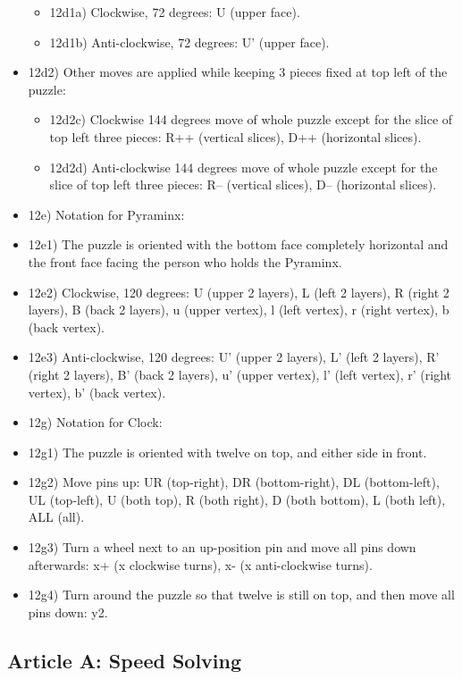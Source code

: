 \begin{itemize}
  \begin{itemize}
  \item
    12d1a) Clockwise, 72 degrees: U (upper face).
  \item
    12d1b) Anti-clockwise, 72 degrees: U' (upper face).
  \end{itemize}
\item
  12d2) Other moves are applied while keeping 3 pieces fixed at top left
  of the puzzle:

  \begin{itemize}
  \item
    12d2c) Clockwise 144 degrees move of whole puzzle except for the
    slice of top left three pieces: R++ (vertical slices), D++
    (horizontal slices).
  \item
    12d2d) Anti-clockwise 144 degrees move of whole puzzle except for
    the slice of top left three pieces: R-- (vertical slices), D--
    (horizontal slices).
  \end{itemize}
\item
  12e) Notation for Pyraminx:
\item
  12e1) The puzzle is oriented with the bottom face completely
  horizontal and the front face facing the person who holds the
  Pyraminx.
\item
  12e2) Clockwise, 120 degrees: U (upper 2 layers), L (left 2 layers), R
  (right 2 layers), B (back 2 layers), u (upper vertex), l (left
  vertex), r (right vertex), b (back vertex).
\item
  12e3) Anti-clockwise, 120 degrees: U' (upper 2 layers), L' (left 2
  layers), R' (right 2 layers), B' (back 2 layers), u' (upper vertex),
  l' (left vertex), r' (right vertex), b' (back vertex).
\item
  12g) Notation for Clock:
\item
  12g1) The puzzle is oriented with twelve on top, and either side in
  front.
\item
  12g2) Move pins up: UR (top-right), DR (bottom-right), DL
  (bottom-left), UL (top-left), U (both top), R (both right), D (both
  bottom), L (both left), ALL (all).
\item
  12g3) Turn a wheel next to an up-position pin and move all pins down
  afterwards: x+ (x clockwise turns), x- (x anti-clockwise turns).
\item
  12g4) Turn around the puzzle so that twelve is still on top, and then
  move all pins down: y2.
\end{itemize}

\subsection{ Article A: Speed Solving}

